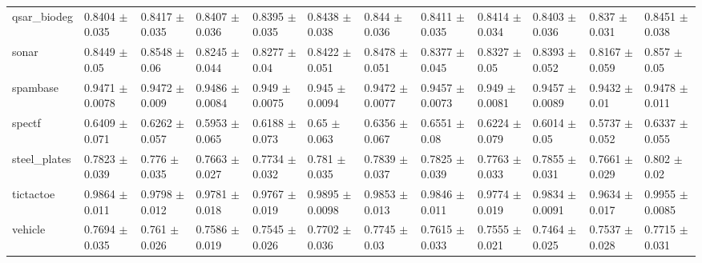 \begin{tabular}{llllllllllll}
qsar\_biodeg & 0.8404 $\pm$ 0.035 & 0.8417 $\pm$ 0.035 & 0.8407 $\pm$ 0.036 & 0.8395 $\pm$ 0.035 & 0.8438 $\pm$ 0.038 & 0.844 $\pm$ 0.036 & 0.8411 $\pm$ 0.035 & 0.8414 $\pm$ 0.034 & 0.8403 $\pm$ 0.036 & 0.837 $\pm$ 0.031 & 0.8451 $\pm$ 0.038 \\
sonar & 0.8449 $\pm$ 0.05 & 0.8548 $\pm$ 0.06 & 0.8245 $\pm$ 0.044 & 0.8277 $\pm$ 0.04 & 0.8422 $\pm$ 0.051 & 0.8478 $\pm$ 0.051 & 0.8377 $\pm$ 0.045 & 0.8327 $\pm$ 0.05 & 0.8393 $\pm$ 0.052 & 0.8167 $\pm$ 0.059 & 0.857 $\pm$ 0.05 \\
spambase & 0.9471 $\pm$ 0.0078 & 0.9472 $\pm$ 0.009 & 0.9486 $\pm$ 0.0084 & 0.949 $\pm$ 0.0075 & 0.945 $\pm$ 0.0094 & 0.9472 $\pm$ 0.0077 & 0.9457 $\pm$ 0.0073 & 0.949 $\pm$ 0.0081 & 0.9457 $\pm$ 0.0089 & 0.9432 $\pm$ 0.01 & 0.9478 $\pm$ 0.011 \\
spectf & 0.6409 $\pm$ 0.071 & 0.6262 $\pm$ 0.057 & 0.5953 $\pm$ 0.065 & 0.6188 $\pm$ 0.073 & 0.65 $\pm$ 0.063 & 0.6356 $\pm$ 0.067 & 0.6551 $\pm$ 0.08 & 0.6224 $\pm$ 0.079 & 0.6014 $\pm$ 0.05 & 0.5737 $\pm$ 0.052 & 0.6337 $\pm$ 0.055 \\
steel\_plates & 0.7823 $\pm$ 0.039 & 0.776 $\pm$ 0.035 & 0.7663 $\pm$ 0.027 & 0.7734 $\pm$ 0.032 & 0.781 $\pm$ 0.035 & 0.7839 $\pm$ 0.037 & 0.7825 $\pm$ 0.039 & 0.7763 $\pm$ 0.033 & 0.7855 $\pm$ 0.031 & 0.7661 $\pm$ 0.029 & 0.802 $\pm$ 0.02 \\
tictactoe & 0.9864 $\pm$ 0.011 & 0.9798 $\pm$ 0.012 & 0.9781 $\pm$ 0.018 & 0.9767 $\pm$ 0.019 & 0.9895 $\pm$ 0.0098 & 0.9853 $\pm$ 0.013 & 0.9846 $\pm$ 0.011 & 0.9774 $\pm$ 0.019 & 0.9834 $\pm$ 0.0091 & 0.9634 $\pm$ 0.017 & 0.9955 $\pm$ 0.0085 \\
vehicle & 0.7694 $\pm$ 0.035 & 0.761 $\pm$ 0.026 & 0.7586 $\pm$ 0.019 & 0.7545 $\pm$ 0.026 & 0.7702 $\pm$ 0.036 & 0.7745 $\pm$ 0.03 & 0.7615 $\pm$ 0.033 & 0.7555 $\pm$ 0.021 & 0.7464 $\pm$ 0.025 & 0.7537 $\pm$ 0.028 & 0.7715 $\pm$ 0.031 \\
\bottomrule
\end{tabular}
